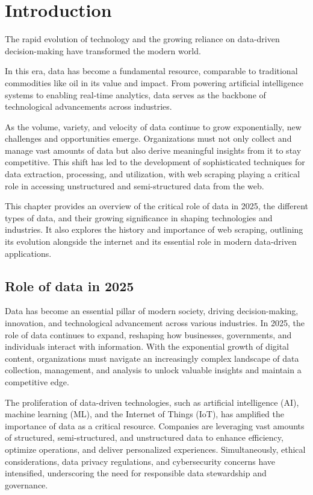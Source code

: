 \chapter{Introduction}
The rapid evolution of technology and the growing reliance on data-driven decision-making have transformed the modern world. 

In this era, data has become a fundamental resource, comparable to traditional commodities like oil in its value and impact. From powering artificial intelligence systems to enabling real-time analytics, data serves as the backbone of technological advancements across industries.

As the volume, variety, and velocity of data continue to grow exponentially, new challenges and opportunities emerge. Organizations must not only collect and manage vast amounts of data but also derive meaningful insights from it to stay competitive. This shift has led to the development of sophisticated techniques for data extraction, processing, and utilization, with web scraping playing a critical role in accessing unstructured and semi-structured data from the web.

This chapter provides an overview of the critical role of data in 2025, the different types of data, and their growing significance in shaping technologies and industries. It also explores the history and importance of web scraping, outlining its evolution alongside the internet and its essential role in modern data-driven applications.
\section{Role of data in  2025}
Data has become an essential pillar of modern society, driving decision-making, innovation, and technological advancement across various industries. In 2025, the role of data continues to expand, reshaping how businesses, governments, and individuals interact with information. With the exponential growth of digital content, organizations must navigate an increasingly complex landscape of data collection, management, and analysis to unlock valuable insights and maintain a competitive edge.

The proliferation of data-driven technologies, such as artificial intelligence (AI), machine learning (ML), and the Internet of Things (IoT), has amplified the importance of data as a critical resource. Companies are leveraging vast amounts of structured, semi-structured, and unstructured data to enhance efficiency, optimize operations, and deliver personalized experiences. Simultaneously, ethical considerations, data privacy regulations, and cybersecurity concerns have intensified, underscoring the need for responsible data stewardship and governance.

